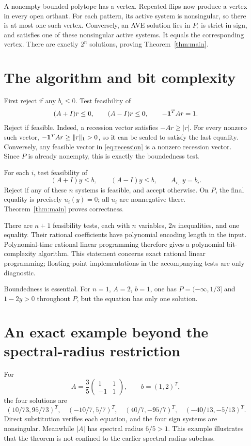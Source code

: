 A nonempty bounded polytope has a vertex. Repeated flips now produce a vertex in every open orthant. For each pattern, its active system is nonsingular, so there is at most one such vertex. Conversely, an AVE solution lies in $P$, is strict in sign, and satisfies one of these nonsingular active systems. It equals the corresponding vertex. There are exactly $2^n$ solutions, proving Theorem~\ref{thm:main}.
\section{The algorithm and bit complexity}
First reject if any $b_i\le0$. Test feasibility of
\begin{equation}\label{eq:recession}
 (A+I)r\le0,\qquad(A-I)r\le0,\qquad-\mathbf 1^TAr=1.
\end{equation}
Reject if feasible. Indeed, a recession vector satisfies $-Ar\ge|r|$. For every nonzero such vector, $-\mathbf 1^TAr\ge\|r\|_1>0$, so it can be scaled to satisfy the last equality. Conversely, any feasible vector in \eqref{eq:recession} is a nonzero recession vector. Since $P$ is already nonempty, this is exactly the boundedness test.

For each $i$, test feasibility of
\begin{equation}\label{eq:face}
 (A+I)y\le b,\qquad(A-I)y\le b,\qquad A_{i,:}y=b_i.
\end{equation}
Reject if any of these $n$ systems is feasible, and accept otherwise. On $P$, the final equality is precisely $u_i(y)=0$; all $u_i$ are nonnegative there. Theorem~\ref{thm:main} proves correctness.

There are $n+1$ feasibility tests, each with $n$ variables, $2n$ inequalities, and one equality. Their rational coefficients have polynomial encoding length in the input. Polynomial-time rational linear programming \cite{lp} therefore gives a polynomial bit-complexity algorithm. This statement concerns exact rational linear programming; floating-point implementations in the accompanying tests are only diagnostic.
\begin{remark}
Boundedness is essential. For $n=1$, $A=2$, $b=1$, one has $P=(-\infty,1/3]$ and $1-2y>0$ throughout $P$, but the equation has only one solution.
\end{remark}

\section{An exact example beyond the spectral-radius restriction}
For
\[
 A=\frac35\begin{pmatrix}1&1\\-1&1\end{pmatrix},\qquad b=(1,2)^T,
\]
the four solutions are
\[
 (10/73,95/73)^T,\quad(-10/7,5/7)^T,\quad
 (40/7,-95/7)^T,\quad(-40/13,-5/13)^T.
\]
Direct substitution verifies each equation, and the four sign systems are
nonsingular. Meanwhile $|A|$ has spectral radius $6/5>1$. This example
illustrates that the theorem is not confined to the earlier spectral-radius
subclass.

